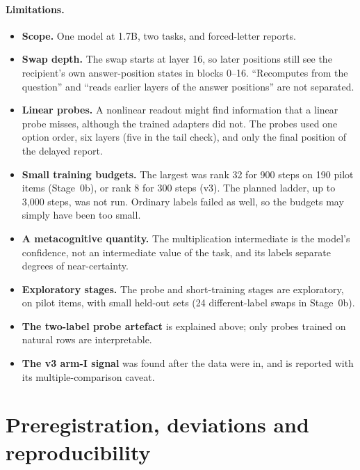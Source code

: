 \documentclass[11pt]{article}
\begin{document}
\paragraph{Limitations.}
\begin{itemize}
\item \textbf{Scope.} One model at 1.7B, two tasks, and forced-letter reports.
\item \textbf{Swap depth.} The swap starts at layer 16, so later positions still see the recipient's own answer-position states in blocks 0--16. ``Recomputes from the question'' and ``reads earlier layers of the answer positions'' are not separated.
\item \textbf{Linear probes.} A nonlinear readout might find information that a linear probe misses, although the trained adapters did not. The probes used one option order, six layers (five in the tail check), and only the final position of the delayed report.
\item \textbf{Small training budgets.} The largest was rank 32 for 900 steps on 190 pilot items (Stage~0b), or rank 8 for 300 steps (v3). The planned ladder, up to 3,000 steps, was not run. Ordinary labels failed as well, so the budgets may simply have been too small.
\item \textbf{A metacognitive quantity.} The multiplication intermediate is the model's confidence, not an intermediate value of the task, and its labels separate degrees of near-certainty.
\item \textbf{Exploratory stages.} The probe and short-training stages are exploratory, on pilot items, with small held-out sets (24 different-label swaps in Stage~0b).
\item \textbf{The two-label probe artefact} is explained above; only probes trained on natural rows are interpretable.
\item \textbf{The v3 arm-I signal} was found after the data were in, and is reported with its multiple-comparison caveat.
\end{itemize}

\section{Preregistration, deviations and reproducibility}
\label{sec:prereg}
\end{document}
